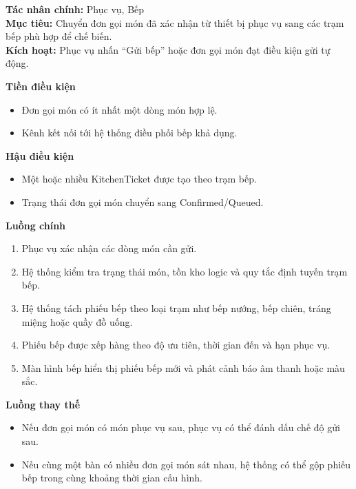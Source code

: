 \documentclass[11pt,a4paper]{article}
\begin{document}
    \begin{usecasebox}[title={UC-ORD-03 --- Gửi đơn gọi món sang bếp}]
    \textbf{Tác nhân chính:} Phục vụ, Bếp\\
    \textbf{Mục tiêu:} Chuyển đơn gọi món đã xác nhận từ thiết bị phục vụ sang các trạm bếp phù hợp để chế biến.\\
    \textbf{Kích hoạt:} Phục vụ nhấn \enquote{Gửi bếp} hoặc đơn gọi món đạt điều kiện gửi tự động.

    \medskip
    \textbf{Tiền điều kiện}
    \begin{itemize}[leftmargin=1.8em]
  \item Đơn gọi món có ít nhất một dòng món hợp lệ.
  \item Kênh kết nối tới hệ thống điều phối bếp khả dụng.
\end{itemize}

    \textbf{Hậu điều kiện}
    \begin{itemize}[leftmargin=1.8em]
  \item Một hoặc nhiều \textsf{KitchenTicket} được tạo theo trạm bếp.
  \item Trạng thái đơn gọi món chuyển sang \textsf{Confirmed/Queued}.
\end{itemize}

    \textbf{Luồng chính}
    \begin{enumerate}[leftmargin=1.8em]
  \item Phục vụ xác nhận các dòng món cần gửi.
  \item Hệ thống kiểm tra trạng thái món, tồn kho logic và quy tắc định tuyến trạm bếp.
  \item Hệ thống tách phiếu bếp theo loại trạm như bếp nướng, bếp chiên, tráng miệng hoặc quầy đồ uống.
  \item Phiếu bếp được xếp hàng theo độ ưu tiên, thời gian đến và hạn phục vụ.
  \item Màn hình bếp hiển thị phiếu bếp mới và phát cảnh báo âm thanh hoặc màu sắc.
\end{enumerate}

    \textbf{Luồng thay thế}
    \begin{itemize}[leftmargin=1.8em]
  \item Nếu đơn gọi món có món phục vụ sau, phục vụ có thể đánh dấu chế độ gửi sau.
  \item Nếu cùng một bàn có nhiều đơn gọi món sát nhau, hệ thống có thể gộp phiếu bếp trong cùng khoảng thời gian cấu hình.
\end{itemize}


\end{usecasebox}
\end{document}
